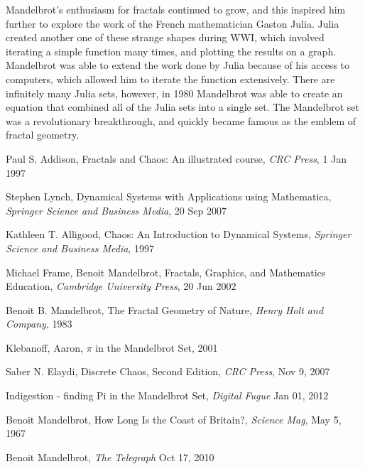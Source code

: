 \documentclass[a4paper]{article}
\begin{document}
Mandelbrot's enthusiasm for fractals continued to grow, and this inspired him further to explore the work of the French mathematician Gaston Julia. Julia created another one of these strange shapes during WWI, which involved iterating a simple function many times, and plotting the results on a graph. Mandelbrot was able to extend the work done by Julia because of his access to computers, which allowed him to iterate the function extensively. There are infinitely many Julia sets, however, in 1980 Mandelbrot was able to create an equation that combined all of the Julia sets into a single set. The Mandelbrot set was a revolutionary breakthrough, and quickly became famous as the emblem of fractal geometry. 

\begin{thebibliography}{}

 Paul S. Addison, Fractals and Chaos: An illustrated course, \emph{CRC Press}, 1 Jan 1997 

 Stephen Lynch, Dynamical Systems with Applications using Mathematica, \emph{Springer Science and Business Media}, 20 Sep 2007

Kathleen T. Alligood, Chaos: An Introduction to Dynamical Systems, \emph{Springer Science and Business Media}, 1997

 Michael Frame, Benoit Mandelbrot, Fractals, Graphics, and Mathematics Education, \emph{Cambridge University Press}, 20 Jun 2002

 Benoit B. Mandelbrot, The Fractal Geometry of Nature, \emph{Henry Holt and Company}, 1983

 Klebanoff, Aaron, $\pi$ in the Mandelbrot Set, 2001 

 Saber N. Elaydi, Discrete Chaos, Second Edition, \emph{CRC Press}, Nov 9, 2007 

 Indigestion - finding Pi in the Mandelbrot Set, \emph{Digital Fugue} Jan 01, 2012

 Benoit Mandelbrot, How Long Is the Coast of Britain?, \emph{Science Mag}, May 5, 1967

 Benoit Mandelbrot, \emph{The Telegraph} Oct 17, 2010

\end{thebibliography}
\end{document}
